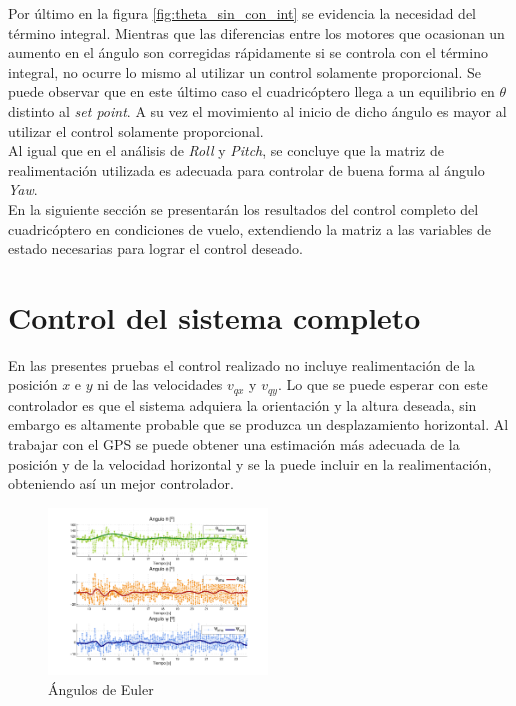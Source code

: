 \documentclass[main]{subfiles}
\begin{document}
Por último en la figura \ref{fig:theta_sin_con_int} se evidencia la necesidad del término integral. Mientras que las diferencias entre los motores que ocasionan un aumento en el ángulo son corregidas rápidamente si se controla con el término integral, no ocurre lo mismo al utilizar un control solamente proporcional. Se puede observar que en este último caso el cuadricóptero llega a un equilibrio en $\theta$ distinto al \emph{set point}. A su vez el movimiento al inicio de dicho ángulo es mayor al utilizar el control solamente proporcional.\\

Al igual que en el análisis de \emph{Roll} y \emph{Pitch}, se concluye que la matriz de realimentación utilizada es adecuada para controlar de buena forma al ángulo \emph{Yaw}. \\

En la siguiente sección se presentarán los resultados del control completo del cuadricóptero en condiciones de vuelo, extendiendo la matriz a las variables de estado necesarias para lograr el control deseado.

\section{Control del sistema completo}
En las presentes pruebas el control realizado no incluye realimentaci\'on de la posici\'on $x$ e $y$ ni de las velocidades $v_{qx}$ y $v_{qy}$. Lo que se puede esperar con este controlador es que el sistema adquiera la orientaci\'on y la altura deseada, sin embargo es altamente probable que se produzca un desplazamiento horizontal. Al trabajar con el GPS se puede obtener una estimaci\'on m\'as adecuada de la posici\'on y de la velocidad horizontal y se la puede incluir en la realimentaci\'on, obteniendo as\'i un mejor controlador.\\

\begin{figure}
	\centering
	\vspace{-20pt}
	\includegraphics[width=0.52\textwidth]{./pics_test_control/euler.pdf}
	\caption{Ángulos de Euler}
	\label{fig:euler}
\end{figure}
\end{document}
